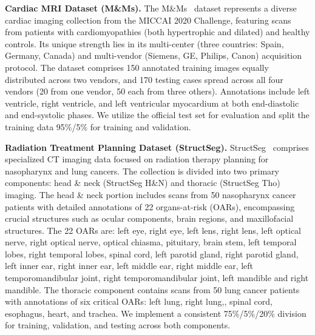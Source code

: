 \noindent\textbf{Cardiac MRI Dataset (M\&Ms).} The M\&Ms~\cite{campello2021multi} dataset represents a diverse cardiac imaging collection from the MICCAI 2020 Challenge, featuring scans from patients with cardiomyopathies (both hypertrophic and dilated) and healthy controls. Its unique strength lies in its multi-center (three countries: Spain, Germany, Canada) and multi-vendor (Siemens, GE, Philips, Canon) acquisition protocol. The dataset comprises 150 annotated training images equally distributed across two vendors, and 170 testing cases spread across all four vendors (20 from one vendor, 50 each from three others). Annotations include left ventricle, right ventricle, and left ventricular myocardium at both end-diastolic and end-systolic phases. We utilize the official test set for evaluation and split the training data 95\%/5\% for training and validation.





\noindent\textbf{Radiation Treatment Planning Dataset (StructSeg).} StructSeg~\cite{structseg} comprises specialized CT imaging data focused on radiation therapy planning for nasopharynx and lung cancers. The collection is divided into two primary components: head \& neck (StructSeg H\&N) and thoracic (StructSeg Tho) imaging. The head \& neck portion includes scans from 50 nasopharynx cancer patients with detailed annotations of 22 organs-at-risk (OARs), encompassing crucial structures such as ocular components, brain regions, and maxillofacial structures. The 22 OARs are: left eye, right eye, left lens, right lens, left optical nerve, right optical nerve, optical chiasma, pituitary, brain stem, left temporal lobes, right temporal lobes, spinal cord, left parotid gland, right parotid gland, left inner ear, right inner ear, left middle ear, right middle ear, left temporomandibular joint, right temporomandibular joint, left mandible and right mandible. The thoracic component contains scans from 50 lung cancer patients with annotations of six critical OARs: left lung, right lung,, spinal cord, esophagus, heart, and trachea. We implement a consistent 75\%/5\%/20\%  division for training, validation, and testing across both components.



